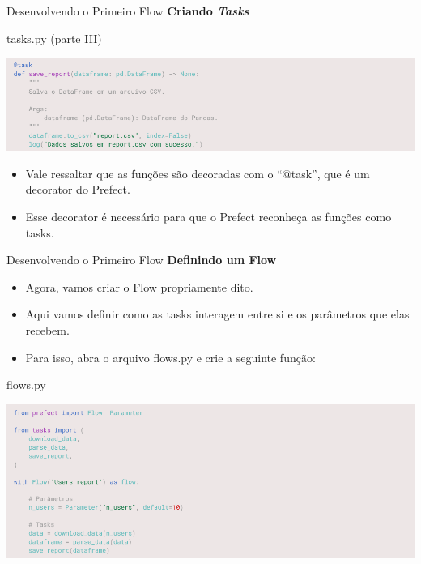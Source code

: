 \documentclass[t,serif]{beamer}
\begin{document}
	\begin{frame}{Desenvolvendo o Primeiro Flow}
		\textbf{Criando \textit{Tasks}}
		\begin{block}{tasks.py (parte III)}
			\begin{center}
				\includegraphics[width=\linewidth]{figs/2_10.png}
			\end{center}
		\end{block}
		\begin{itemize}
			\item Vale ressaltar que as funções são decoradas com o ``@task'', que é um decorator do Prefect.
			\item Esse decorator é necessário para que o Prefect reconheça as funções como tasks.
		\end{itemize}
	\end{frame}
	
	\begin{frame}{Desenvolvendo o Primeiro Flow}
		\textbf{Definindo um Flow}
		\begin{itemize}
			\item Agora, vamos criar o Flow propriamente dito.
			\item Aqui vamos definir como as tasks interagem entre si e os parâmetros que elas recebem. 
			\item Para isso, abra o arquivo flows.py e crie a seguinte função:
		\end{itemize}
		\begin{block}{flows.py}
			\begin{center}
				\includegraphics[width=\linewidth]{figs/2_11.png}
			\end{center}
		\end{block}
	\end{frame}
	
\end{document}
